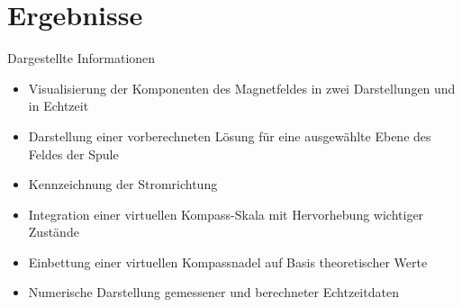\part{Ergebnisse}
\label{part:results}
\begin{frame}[fragile]{Dargestellte Informationen}
\begin{itemize}
	\item Visualisierung der Komponenten des Magnetfeldes in zwei Darstellungen und in Echtzeit
	\item Darstellung einer vorberechneten Lösung für eine ausgewählte Ebene des Feldes der Spule
	\item Kennzeichnung der Stromrichtung
	\item Integration einer virtuellen Kompass-Skala mit Hervorhebung wichtiger Zustände
	\item Einbettung einer virtuellen Kompassnadel auf Basis theoretischer Werte
	\item Numerische Darstellung gemessener und berechneter Echtzeitdaten
\end{itemize}
\end{frame}

